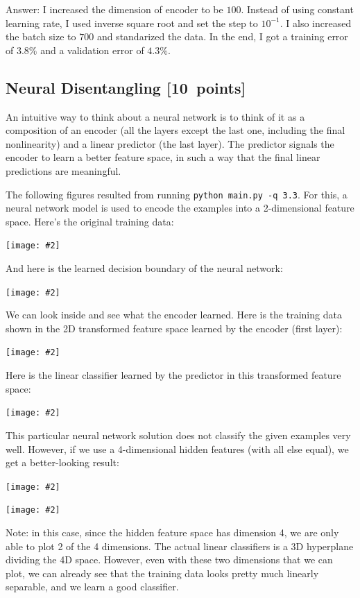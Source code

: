\documentclass{article}
\newenvironment{answer}{\par\begingroup\color{gre}Answer: }{\endgroup}
\newcommand\pts[1]{\textcolor{pointscolour}{[#1~points]}}
\newcommand{\centerfig}[2]{\begin{center}\texttt{[image: \#2]}\end{center}}
\begin{document}
\begin{answer}
	I increased the dimension of encoder to be $100$. Instead of using constant learning rate, I used inverse square root and set the step to $10^{-1}$. I also increased the batch size to $700$ and standarized the data. In the end, I got a training error of $3.8\%$ and a validation error of $4.3\%$.
\end{answer}


\subsection{Neural Disentangling \pts{10}}

An intuitive way to think about a neural network is to think of it as a composition of an encoder (all the layers except the last one, including the final nonlinearity) and a linear predictor (the last layer). The predictor signals the encoder to learn a better feature space, in such a way that the final linear predictions are meaningful.

The following figures resulted from running \texttt{python main.py -q 3.3}. For this, a neural network model is used to encode the examples into a 2-dimensional feature space. Here's the original training data:

\centerfig{.7}{./figs/sinusoids.png}

And here is the learned decision boundary of the neural network:

\centerfig{.7}{./figs/sinusoids_decision_boundary_[2]_2.png}

We can look inside and see what the encoder learned. Here is the training data shown in the 2D transformed feature space learned by the encoder (first layer):

\centerfig{.7}{./figs/sinusoids_learned_features_[2]_2.png}

Here is the linear classifier learned by the predictor in this transformed feature space:

\centerfig{.7}{./figs/sinusoids_linear_boundary_[2]_2.png}


This particular neural network solution does not classify the given examples very well. However, if we use a 4-dimensional hidden features (with all else equal), we get a better-looking result:

\centerfig{.7}{./figs/sinusoids_decision_boundary_[4]_2.png}
\centerfig{.7}{./figs/sinusoids_linear_boundary_[4]_2.png}

Note: in this case, since the hidden feature space has dimension 4, we are only able to plot 2 of the 4 dimensions. The actual linear classifiers is a 3D hyperplane dividing the 4D space. However, even with these two dimensions that we can plot, we can already see that the training data looks pretty much linearly separable, and we learn a good classifier.
\end{document}
